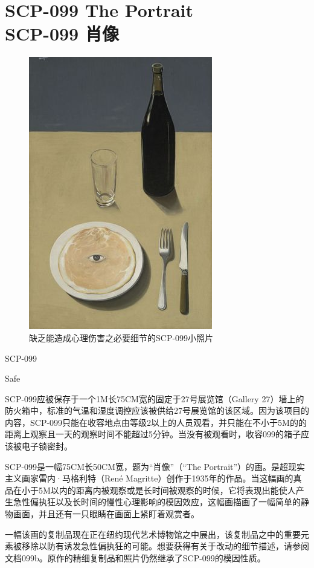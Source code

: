 \chapter[SCP-099 肖像]{
    SCP-099 The Portrait\\
    SCP-099 肖像
}

\label{chap:SCP-099}

\begin{figure}[H]
    \centering
    \includegraphics[width=0.5\linewidth]{images/SCP.099.jpg}
    \caption*{缺乏能造成心理伤害之必要细节的SCP-099小照片}
\end{figure}

SCP-099

Safe

SCP-099应被保存于一个1M长75CM宽的固定于27号展览馆（Gallery 27）墙上的防火箱中，标准的气温和湿度调控应该被供给27号展览馆的该区域。因为该项目的内容，SCP-099只能在收容地点由等级2以上的人员观看，并只能在不小于5M的的距离上观察且一天的观察时间不能超过5分钟。当没有被观看时，收容099的箱子应该被电子锁密封。

SCP-099是一幅75CM长50CM宽，题为“肖像”（“The Portrait”）的画。是超现实主义画家雷内·马格利特（René Magritte）创作于1935年的作品。当这幅画的真品在小于5M以内的距离内被观察或是长时间被观察的时候，它将表现出能使人产生急性偏执狂以及长时间的慢性心理影响的模因效应，这幅画描画了一幅简单的静物画面，并且还有一只眼睛在画面上紧盯着观赏者。

一幅该画的复制品现在正在纽约现代艺术博物馆之中展出，该复制品之中的重要元素被移除以防有诱发急性偏执狂的可能。想要获得有关于改动的细节描述，请参阅文档099b。原作的精细复制品和照片仍然继承了SCP-099的模因性质。

